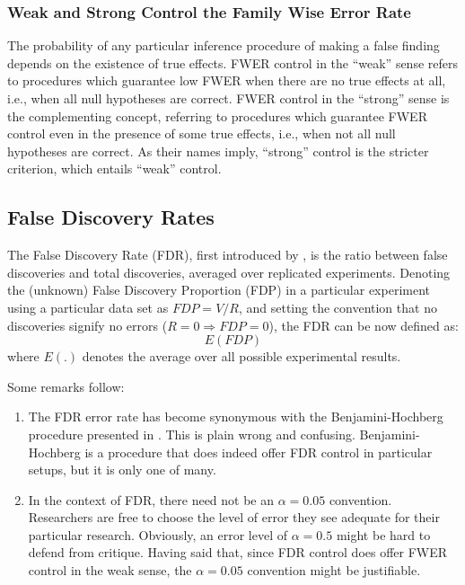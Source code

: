 \documentclass[review,12pt]{article}
\begin{document}
\subsubsection{Weak and Strong Control the Family Wise Error Rate}
The probability of any particular inference procedure of making a false finding depends on the existence of true effects. FWER control in the ``weak'' sense refers to procedures which guarantee low FWER when there are no true effects at all, i.e., when all null hypotheses are correct. 
FWER control in the ``strong'' sense is the complementing concept, referring to procedures which guarantee FWER control even in the presence of some true effects, i.e., when not all null hypotheses are correct. 
As their names imply, ``strong'' control is the stricter criterion, which entails ``weak'' control.




\subsection{\label{sub:fdr}False Discovery Rates}

The False Discovery Rate (FDR), first introduced by \citet{benjamini_controlling_1995}, is the ratio between false discoveries and total discoveries, averaged over replicated experiments. 
Denoting the (unknown) False Discovery Proportion (FDP) in a particular experiment using a particular data set as $ FDP=V/R $, and setting the convention that no discoveries signify no errors ($R=0 \Rightarrow FDP=0$), the FDR can be now defined as:
$$E \left( FDP \right)$$ 
where $E(.)$ denotes the average over all possible experimental results.


Some remarks follow:
\begin{enumerate}
\item The FDR error rate has become synonymous with the Benjamini-Hochberg procedure presented in \citep{benjamini_controlling_1995} . This is plain wrong and confusing. Benjamini-Hochberg is a procedure that does indeed offer FDR control in particular setups, but it is only one of many.
\item In the context of FDR, there need not be an $\alpha=0.05$ convention. Researchers are free to choose the level of error they see adequate for their particular research. Obviously, an error level of $\alpha=0.5$ might be hard to defend from critique. Having said that, since FDR control does offer FWER control in the weak sense, the $\alpha=0.05$ convention might be justifiable.
\end{enumerate}
\end{document}
